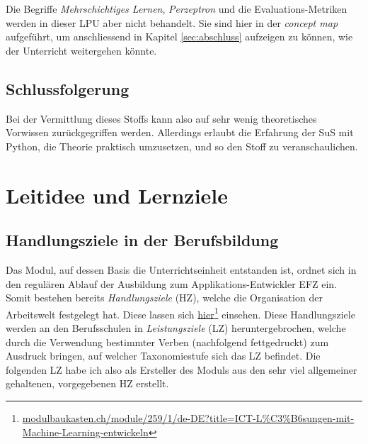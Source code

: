 \documentclass[twocolumn]{article}
\begin{document}
Die Begriffe \textit{Mehrschichtiges Lernen}, \textit{Perzeptron} und die Evaluations-Metriken werden in dieser LPU aber nicht behandelt. Sie sind hier in der \textit{concept map} aufgeführt, um anschliessend in Kapitel \ref{sec:abschluss} aufzeigen zu können, wie der Unterricht weitergehen könnte.

\subsection{Schlussfolgerung}

Bei der Vermittlung dieses Stoffs kann also auf sehr wenig theoretisches Vorwissen zurückgegriffen werden. Allerdings erlaubt die Erfahrung der SuS mit Python, die Theorie praktisch umzusetzen, und so den Stoff zu veranschaulichen.



\section{Leitidee und Lernziele}
\label{sec:leitidee}

\subsection{Handlungsziele in der Berufsbildung}
Das Modul, auf dessen Basis die Unterrichtseinheit entstanden ist, ordnet sich in den regulären Ablauf der Ausbildung zum Applikations-Entwickler EFZ ein. Somit bestehen bereits \textit{Handlungsziele} (HZ), welche die Organisation der Arbeitswelt festgelegt hat. Diese lassen sich \href{https://www.modulbaukasten.ch/module/259/1/de-DE?title=ICT-L%C3%B6sungen-mit-Machine-Learning-entwickeln}{hier}\footnote{\url{modulbaukasten.ch/module/259/1/de-DE?title=ICT-L\%C3\%B6sungen-mit-Machine-Learning-entwickeln}} einsehen. Diese Handlungsziele werden an den Berufsschulen in \textit{Leistungsziele} (LZ) heruntergebrochen, welche durch die Verwendung bestimmter Verben (nachfolgend fettgedruckt) zum Ausdruck bringen, auf welcher Taxonomiestufe sich das LZ befindet. Die folgenden LZ habe ich also als Ersteller des Moduls aus den sehr viel allgemeiner gehaltenen, vorgegebenen HZ erstellt.
\end{document}
